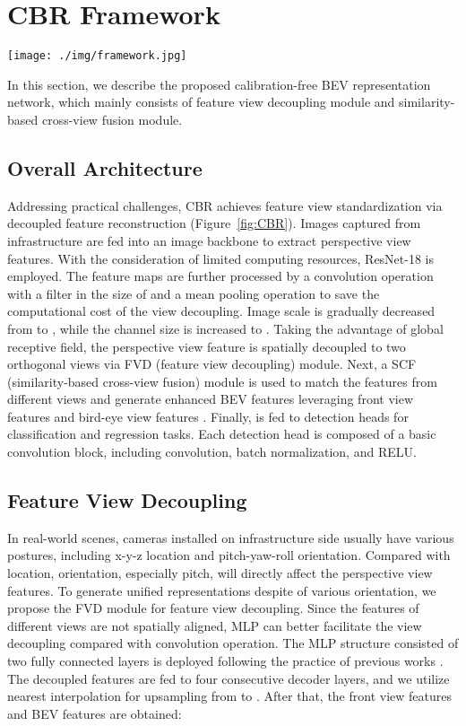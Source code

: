 \documentclass[letterpaper, 10 pt, conference]{ieeeconf}
\begin{document}
\section{CBR Framework}

\begin{figure*}
  \centering
  \texttt{[image: ./img/framework.jpg]}
  \caption{Framework of the Calibration-free BEV Representation (CBR) network.}
  \label{fig:CBR}
\end{figure*}

\label{sec:method}
In this section, we describe the proposed calibration-free BEV representation network, which mainly consists of  feature view decoupling module and  similarity-based cross-view fusion module.

\subsection{Overall Architecture}
Addressing practical challenges, CBR achieves feature view standardization via decoupled feature reconstruction (Figure~\ref{fig:CBR}). Images captured from infrastructure are fed into an image backbone to extract perspective view features. With the consideration of limited computing resources, ResNet-18 is employed. The feature maps are further processed by a convolution operation with a filter in the size of  and a mean pooling operation to save the computational cost of the view decoupling. Image scale is gradually decreased from  to , while the channel size is increased to . Taking the advantage of global receptive field, the perspective view feature  is spatially decoupled to two orthogonal views via FVD (feature view decoupling) module. Next, a SCF (similarity-based cross-view fusion) module is used to match the features from different views and generate enhanced BEV features  leveraging front view features  and bird-eye view features . Finally,  is fed to  detection heads for classification and regression tasks. Each detection head is composed of a 
basic convolution block, including convolution, batch normalization, and RELU.

\subsection{Feature View Decoupling}
In real-world scenes, cameras installed on infrastructure side usually have various postures, including x-y-z location and pitch-yaw-roll orientation. Compared with location, orientation, especially pitch, will directly affect the perspective view features. To generate unified representations despite of various orientation, we propose the FVD module for feature view decoupling. Since the features of different views are not spatially aligned, MLP can better facilitate the view decoupling compared with convolution operation. The MLP structure consisted of two fully connected layers is deployed following the practice of previous works \cite{pan2020cross, pyva}. The decoupled features are fed to four consecutive decoder layers, and we utilize nearest interpolation for upsampling from  to . After that, the front view features  and BEV features  are obtained:
\end{document}

